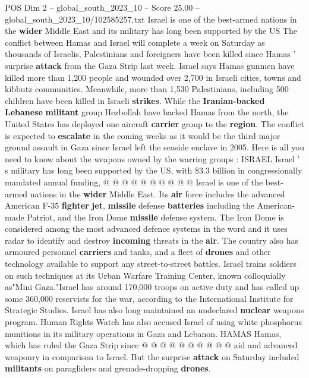 \begin{textsample}{POS Dim 2 – global\_south\_2023\_10 – Score 25.00 – global\_south\_2023\_10/102585257.txt}  \label{ex:f2_pos_052}
Israel is one of the best-armed nations in the \textbf{wider} Middle East and its military has long been supported by the US The conflict between Hamas and Israel will complete a week on Saturday as thousands of Israelis, Palestinians and foreigners have been killed since Hamas ' surprise \textbf{attack} from the Gaza Strip last week.
Israel says Hamas gunmen have killed more than 1,200 people and wounded over 2,700 in Israeli cities, towns and kibbutz communities.
Meanwhile, more than 1,530 Palestinians, including 500 children have been killed in Israeli \textbf{strikes}.
While the \textbf{Iranian-backed} \textbf{Lebanese} \textbf{militant} group Hezbollah have backed Hamas from the north, the United States has deployed one aircraft \textbf{carrier} group to the \textbf{region}.
The conflict is expected to \textbf{escalate} in the coming weeks as it would be the third major ground assault in Gaza since Israel left the seaside enclave in 2005.
Here is all you need to know about the weapons owned by the warring groups : ISRAEL Israel ' s military has long been supported by the US, with \$3.3 billion in congressionally mandated annual funding, @ @ @ @ @ @ @ @ @ @ Israel is one of the best-armed nations in the \textbf{wider} Middle East.
Its \textbf{air} force includes the advanced American F-35 \textbf{fighter} \textbf{jet}, \textbf{missile} defense \textbf{batteries} including the American-made Patriot, and the Iron Dome \textbf{missile} defense system.
The Iron Dome is considered among the most advanced defence systems in the word and it uses radar to identify and destroy \textbf{incoming} threats in the \textbf{air}.
The country also has armoured personnel \textbf{carriers} and tanks, and a fleet of \textbf{drones} and other technology available to support any street-to-street battles.
Israel trains soldiers on such techniques at its Urban Warfare Training Center, known colloquially as"Mini Gaza."Israel has around 170,000 troops on active duty and has called up some 360,000 reservists for the war, according to the International Institute for Strategic Studies.
Israel has also long maintained an undeclared \textbf{nuclear} weapons program.
Human Rights Watch has also accused Israel of using white phosphorus munitions in its military operations in Gaza and Lebanon.
HAMAS Hamas, which has ruled the Gaza Strip since @ @ @ @ @ @ @ @ @ @ aid and advanced weaponry in comparison to Israel.
But the surprise \textbf{attack} on Saturday included \textbf{militants} on paragliders and grenade-dropping \textbf{drones}.

\end{textsample}
